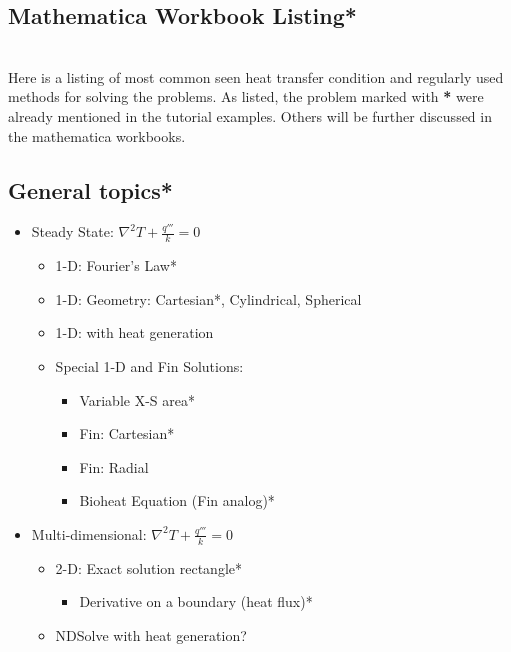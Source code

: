 \begin{appendices}
\appendixpage
\noappendicestocpagenum
\addappheadtotoc

\newcommand{\myWSEgPath}[1] {
\label{example:#1}
  \textcolor{blue} {(Please refer to .../workshopNB/#1.nb)}}

\renewcommand{\thesection}{\arabic{section}}

\chapter*{Mathematica Workbook Listing*}
~\\Here is a listing of most common seen heat transfer condition and regularly used methods for solving the problems. As listed, the problem marked with \textbf{*} were already mentioned in the tutorial examples. Others will be further discussed in the mathematica workbooks.

\section*{General topics*}

\begin{itemize}
\item Steady State: $\nabla^2T+\frac{q'''}{k}=0$
\begin{itemize}
\item 1-D: Fourier's Law*
\item 1-D: Geometry: Cartesian*, Cylindrical, Spherical
\item 1-D: with heat generation
\item Special 1-D and Fin Solutions:
\begin{itemize}
\item Variable X-S area*
\item Fin: Cartesian*
\item Fin: Radial
\item Bioheat Equation (Fin analog)*
\end{itemize}
\end{itemize}

\item Multi-dimensional: $\nabla^2T+\frac{q'''}{k}=0$
\begin{itemize}
\item 2-D: Exact solution rectangle*
\begin{itemize}
\item Derivative on a boundary (heat flux)*
\end{itemize}
\item NDSolve with heat generation?
\end{itemize}


\end{itemize}
\end{appendices}
